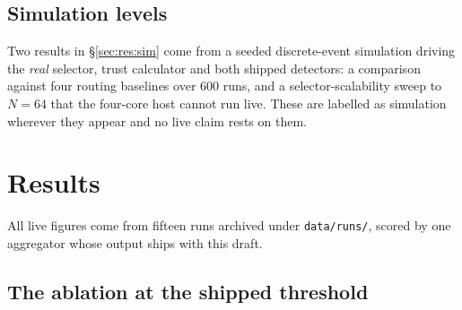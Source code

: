 \documentclass[10pt,twocolumn,letterpaper]{article}
\begin{document}
\subsection{Simulation levels}
Two results in \S\ref{sec:res:sim} come from a seeded discrete-event
simulation driving the \emph{real} selector, trust calculator and both shipped
detectors: a comparison against four routing baselines over $600$ runs, and a
selector-scalability sweep to $N = 64$ that the four-core host cannot run live.
These are labelled as simulation wherever they appear and no live claim rests
on them.

\section{Results}
\label{sec:results}

All live figures come from fifteen runs archived under \texttt{data/runs/},
scored by one aggregator whose output ships with this draft.

\subsection{The ablation at the shipped threshold}
\label{sec:res:ablation}
\end{document}
